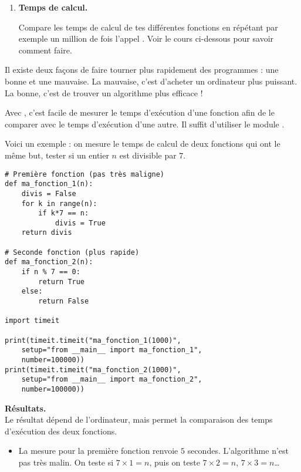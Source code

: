 \documentclass[11pt,class=report,crop=false]{standalone}
\begin{document}
\begin{activite}
\begin{enumerate}
  
  \item \textbf{Temps de calcul.}
  
  Compare les temps de calcul de tes différentes fonctions  en répétant par exemple un million de fois l'appel . Voir le cours ci-dessous pour savoir comment faire.
\end{enumerate}   
     
\end{activite}


\begin{cours}

Il existe deux façons de faire tourner plus rapidement des programmes : une bonne et une mauvaise. La mauvaise, c'est d'acheter un ordinateur plus puissant.
La bonne, c'est de trouver un algorithme plus efficace !

Avec \Python, c'est facile de mesurer le temps d'exécution d'une fonction afin de le comparer avec le temps d'exécution d'une autre. Il suffit d'utiliser le module .


Voici un exemple : on mesure le temps de calcul de deux fonctions qui ont le même but, tester si un entier $n$ est divisible par $7$.

\begin{lstlisting}  
# Première fonction (pas très maligne)
def ma_fonction_1(n):
    divis = False
    for k in range(n):
        if k*7 == n:
            divis = True
    return divis

# Seconde fonction (plus rapide)
def ma_fonction_2(n):
    if n % 7 == 0:
        return True
    else:
        return False

import timeit

print(timeit.timeit("ma_fonction_1(1000)", 
    setup="from __main__ import ma_fonction_1", 
    number=100000))
print(timeit.timeit("ma_fonction_2(1000)", 
    setup="from __main__ import ma_fonction_2", 
    number=100000))
\end{lstlisting} 

\textbf{Résultats.} \\
Le résultat dépend de l'ordinateur, mais permet la comparaison des temps d'exécution des deux fonctions.
\begin{itemize}
  \item La mesure pour la première fonction renvoie $5$ secondes. L'algorithme n'est pas très malin. On teste
  si $7\times 1 =n$, puis on teste $7\times 2 = n$, $7\times 3 = n$\ldots
  

\end{itemize}
\end{cours}
\end{document}

